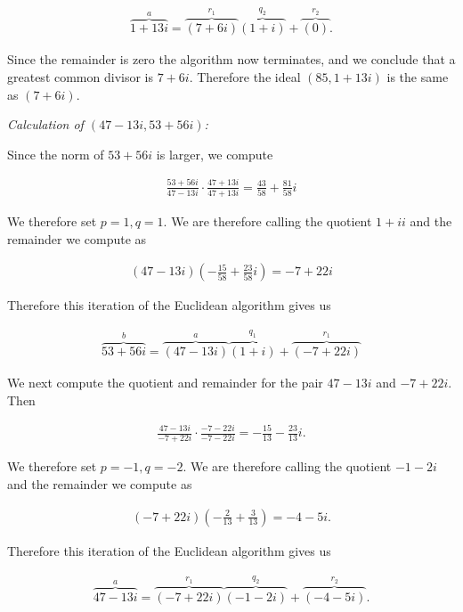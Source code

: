 \documentclass[11pt]{article}
\begin{document}
\begin{align*}
    \overbrace{1+13i}^{a}=\overbrace{(7+6i)}^{r_1}\overbrace{(1+i)}^{q_2} + \overbrace{(0)}^{r_2}.
\end{align*}

Since the remainder is zero the algorithm now terminates, and we conclude that a greatest common divisor is $7+6i$.  Therefore the ideal $(85,1+13i)$ is the same as $(7+6i)$.

{\it Calculation of $(47-13i, 53+56i)$:} 

Since the norm of $53+56i$ is larger, we compute 

\begin{align*}
    \frac{53+56i}{47-13i}\cdot \frac{47+13i}{47+13i} = \frac{43}{58} + \frac{81}{58}i
\end{align*}

We therefore set $p=1,q=1$.  We are therefore calling the quotient $1+ii$ and the remainder we compute as 

\begin{align*}
    (47-13i)\left(-\frac{15}{58} + \frac{23}{58}i\right) = -7+22i
\end{align*}

Therefore this iteration of the Euclidean algorithm gives us 

\begin{align*}
    \overbrace{53+56i}^{b}=\overbrace{(47-13i)}^{a}\overbrace{(1+i)}^{q_1} + \overbrace{(-7+22i)}^{r_1}
\end{align*}

We next compute the quotient and remainder for the pair $47-13i$ and $-7+22i$.  Then 

\begin{align*}
    \frac{47-13i}{-7+22i}\cdot \frac{-7-22i}{-7-22i} = -\frac{15}{13}-\frac{23}{13}i.
\end{align*}

We therefore set $p=-1,q=-2$.  We are therefore calling the quotient $-1-2i$ and the remainder we compute as 

\begin{align*}
    (-7+22i)\left(-\frac 2 {13} +\frac{3}{13}\right) = -4-5i.
\end{align*}

Therefore this iteration of the Euclidean algorithm gives us 

\begin{align*}
    \overbrace{47-13i}^{a}=\overbrace{(-7+22i)}^{r_1}\overbrace{(-1-2i)}^{q_2} + \overbrace{(-4-5i)}^{r_2}.
\end{align*}
\end{document}
